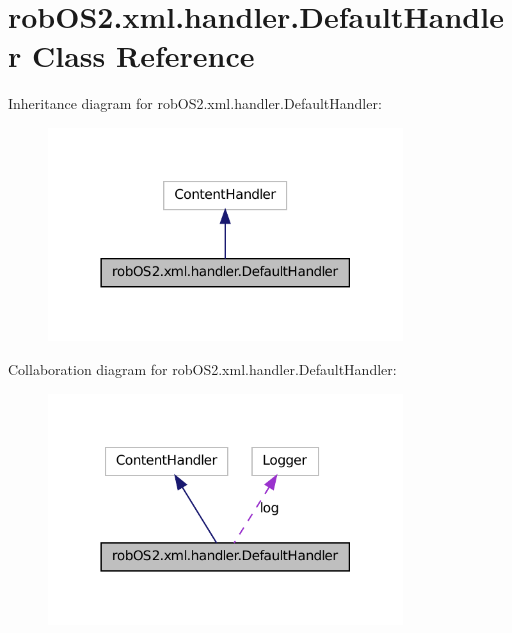 \hypertarget{classrob_o_s2_1_1xml_1_1handler_1_1_default_handler}{
\section{robOS2.xml.handler.DefaultHandler Class Reference}
\label{classrob_o_s2_1_1xml_1_1handler_1_1_default_handler}
}


Inheritance diagram for robOS2.xml.handler.DefaultHandler:\nopagebreak
\begin{figure}[H]
\begin{center}
\leavevmode
\includegraphics[width=266pt]{classrob_o_s2_1_1xml_1_1handler_1_1_default_handler__inherit__graph}
\end{center}
\end{figure}


Collaboration diagram for robOS2.xml.handler.DefaultHandler:\nopagebreak
\begin{figure}[H]
\begin{center}
\leavevmode
\includegraphics[width=266pt]{classrob_o_s2_1_1xml_1_1handler_1_1_default_handler__coll__graph}
\end{center}
\end{figure}
